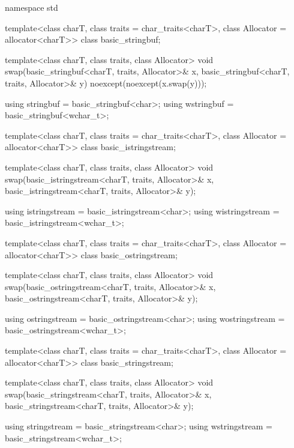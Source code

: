 %
%
%
%
%
%
%
%
%
%
%
%
%
%
%
%
%
\begin{codeblock}
namespace std {
  template<class charT, class traits = char_traits<charT>,
           class Allocator = allocator<charT>>
    class basic_stringbuf;

  template<class charT, class traits, class Allocator>
    void swap(basic_stringbuf<charT, traits, Allocator>& x,
              basic_stringbuf<charT, traits, Allocator>& y) noexcept(noexcept(x.swap(y)));

  using stringbuf  = basic_stringbuf<char>;
  using wstringbuf = basic_stringbuf<wchar_t>;

  template<class charT, class traits = char_traits<charT>,
           class Allocator = allocator<charT>>
    class basic_istringstream;

  template<class charT, class traits, class Allocator>
    void swap(basic_istringstream<charT, traits, Allocator>& x,
              basic_istringstream<charT, traits, Allocator>& y);

  using istringstream  = basic_istringstream<char>;
  using wistringstream = basic_istringstream<wchar_t>;

  template<class charT, class traits = char_traits<charT>,
           class Allocator = allocator<charT>>
    class basic_ostringstream;

  template<class charT, class traits, class Allocator>
    void swap(basic_ostringstream<charT, traits, Allocator>& x,
              basic_ostringstream<charT, traits, Allocator>& y);

  using ostringstream  = basic_ostringstream<char>;
  using wostringstream = basic_ostringstream<wchar_t>;

  template<class charT, class traits = char_traits<charT>,
           class Allocator = allocator<charT>>
    class basic_stringstream;

  template<class charT, class traits, class Allocator>
    void swap(basic_stringstream<charT, traits, Allocator>& x,
              basic_stringstream<charT, traits, Allocator>& y);

  using stringstream  = basic_stringstream<char>;
  using wstringstream = basic_stringstream<wchar_t>;
}
\end{codeblock}

